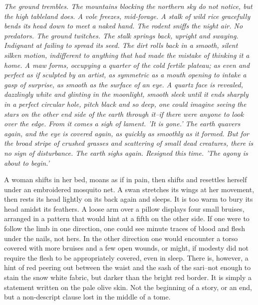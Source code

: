 \documentclass{article}
\begin{document}
\emph{The ground trembles. The mountains blocking the northern sky do not notice, but the high tableland does. A vole freezes, mid-forage. A stalk of wild rice gracefully bends its head down to meet a naked hand. The rodent sniffs the night air. No predators. The ground twitches. The stalk springs back, upright and swaying. Indignant at failing to spread its seed. The dirt rolls back in a smooth, silent silken motion, indifferent to anything that had made the mistake of thinking it a home. A maw forms, occupying a quarter of the cold fertile plateau; as even and perfect as if sculpted by an artist, as symmetric as a mouth opening to intake a gasp of surprise, as smooth as the surface of an eye. A quartz face is revealed, dazzlingly white and glinting in the moonlight, smooth sleek until it ends sharply in a perfect circular hole, pitch black and so deep, one could imagine seeing the stars on the other end side of the earth through it--if there were anyone to look over the edge. From it comes a sigh of lament. 'It is gone.' The earth quavers again, and the eye is covered again, as quickly as smoothly as it formed. But for the broad stripe of crushed grasses and scattering of small dead creatures, there is no sign of disturbance. The earth sighs again. Resigned this time. 'The agony is about to begin.'}

\vspace{.25cm}

A woman shifts in her bed, moans as if in pain, then shifts and resettles herself under an embroidered mosquito net. A swan stretches its wings at her movement, then rests its head lightly on its back again and sleeps. It is too warm to bury its head amidst its feathers. A loose arm over a pillow displays four small bruises, arranged in a pattern that would hint at a fifth on the other side. If one were to follow the limb in one direction, one could see minute traces of blood and flesh under the nails, not hers. In the other direction one would encounter a torso covered with more bruises and a few open wounds, or might, if modesty did not require the flesh to be appropriately covered, even in sleep. There is, however, a hint of red peering out between the waist and the sash of the sari--not enough to stain the snow white fabric, but darker than the bright red border. It is simply a statement written on the pale olive skin. Not the beginning of a story, or an end, but a non-descript clause lost in the middle of a tome.
\end{document}
